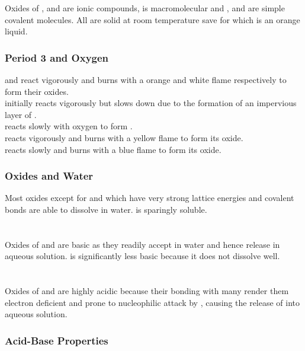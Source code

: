\documentclass[../main]{subfiles}
\begin{document}
	Oxides of ,  and  are ionic compounds,  is macromolecular and ,  and  are simple covalent molecules. All are solid at room temperature save for  which is an orange liquid. \\

	\subsubsection{Period 3 and Oxygen}

	 and  react vigorously and burns with a orange and white flame respectively to form their oxides. \\
	 initially reacts vigorously but slows down due to the formation of an impervious layer of . \\
	 reacts slowly with oxygen to form . \\
	 reacts vigorously and burns  with a yellow flame to form its oxide. \\
	 reacts slowly and burns with a blue flame to form its oxide. \\

	\subsubsection{Oxides and Water}

	Most oxides except for  and  which have very strong lattice energies and covalent bonds are able to dissolve in water.  is sparingly soluble. \\

	 \\
	 \\
	Oxides of  and  are basic as they readily accept  in water and hence release  in aqueous solution.  is significantly less basic because it does not dissolve well. \\

	 \\
	 \\
	Oxides of  and  are highly acidic because their bonding with many  render them electron deficient and prone to nucleophilic attack by , causing the release of  into aqueous solution.

	\subsubsection{Acid-Base Properties}
\end{document}
